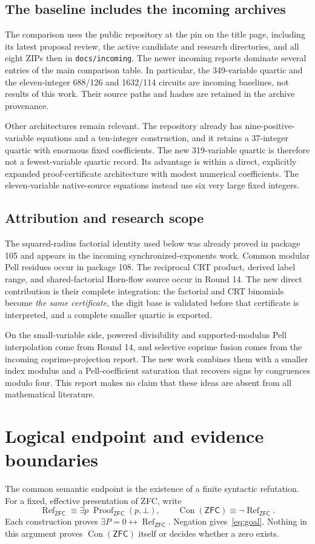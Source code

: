 \documentclass[11pt]{article}
\newcommand{\Con}{\operatorname{Con}}
\newcommand{\ZFC}{\mathsf{ZFC}}
\newcommand{\code}[1]{\texttt{\small #1}}
\theoremstyle{definition}\newtheorem{definition}[theorem]{Definition}
\theoremstyle{remark}\newtheorem{remark}[theorem]{Remark}
\begin{document}
\subsection{The baseline includes the incoming archives}
The comparison uses the public repository at the pin on the title page,
including its latest proposal review, the active candidate and research
directories, and all eight ZIPs then in \code{docs/incoming}.
The newer incoming reports dominate several entries of the main comparison
table. In particular, the 349-variable quartic and the eleven-integer
688/126 and 1632/114 circuits are incoming baselines, not results of this
work. Their source paths and hashes are retained in the archive provenance.

Other architectures remain relevant. The repository already has
nine-positive-variable equations and a ten-integer construction, and it
retains a 37-integer quartic with enormous fixed coefficients. The new
319-variable quartic is therefore not a fewest-variable quartic record.
Its advantage is within a direct, explicitly expanded proof-certificate
architecture with modest numerical coefficients. The eleven-variable
native-source equations instead use six very large fixed integers.

\subsection{Attribution and research scope}
The squared-radius factorial identity used below was already proved in
package 105 and appears in the incoming synchronized-exponents work.
Common modular Pell residues occur in package 108. The reciprocal CRT
product, derived label range, and shared-factorial Horn-flow source occur
in Round 14. The new direct contribution is their complete integration:
the factorial and CRT binomials become \emph{the same certificate}, the
digit base is validated before that certificate is interpreted, and a
complete smaller quartic is exported.

On the small-variable side, powered divisibility and supported-modulus
Pell interpolation come from Round 14, and selective coprime fusion comes
from the incoming coprime-projection report. The new work combines them
with a smaller index modulus and a Pell-coefficient saturation that
recovers signs by congruences modulo four. This report makes no claim that
these ideas are absent from all mathematical literature.

\section{Logical endpoint and evidence boundaries}
The common semantic endpoint is the existence of a finite syntactic
refutation. For a fixed, effective presentation of ZFC, write
\[
 \operatorname{Ref}_{\ZFC}\equiv
 \exists p\;\operatorname{Proof}_{\ZFC}(p,\bot),\qquad
 \Con(\ZFC)\equiv\neg\operatorname{Ref}_{\ZFC}.
\]
Each construction proves $\exists P=0\leftrightarrow
\operatorname{Ref}_{\ZFC}$. Negation gives~\eqref{eq:goal}. Nothing in this
argument proves $\Con(\ZFC)$ itself or decides whether a zero exists.
\end{document}
